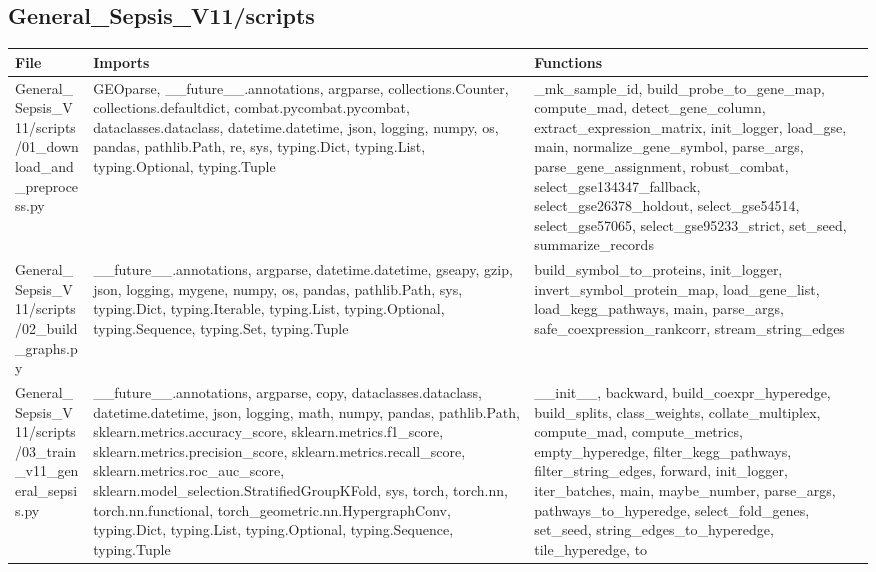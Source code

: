 \documentclass[11pt]{article}
\begin{document}
\subsection{General\_Sepsis\_V11/scripts}
\begin{longtable}{p{}p{}p{}}
\textbf{File} & \textbf{Imports} & \textbf{Functions} \\ \hline
General\_Sepsis\_V11/scripts/01\_download\_and\_preprocess.py & GEOparse, \_\_future\_\_.annotations, argparse, collections.Counter, collections.defaultdict, combat.pycombat.pycombat, dataclasses.dataclass, datetime.datetime, json, logging, numpy, os, pandas, pathlib.Path, re, sys, typing.Dict, typing.List, typing.Optional, typing.Tuple & \_mk\_sample\_id, build\_probe\_to\_gene\_map, compute\_mad, detect\_gene\_column, extract\_expression\_matrix, init\_logger, load\_gse, main, normalize\_gene\_symbol, parse\_args, parse\_gene\_assignment, robust\_combat, select\_gse134347\_fallback, select\_gse26378\_holdout, select\_gse54514, select\_gse57065, select\_gse95233\_strict, set\_seed, summarize\_records \\
General\_Sepsis\_V11/scripts/02\_build\_graphs.py & \_\_future\_\_.annotations, argparse, datetime.datetime, gseapy, gzip, json, logging, mygene, numpy, os, pandas, pathlib.Path, sys, typing.Dict, typing.Iterable, typing.List, typing.Optional, typing.Sequence, typing.Set, typing.Tuple & build\_symbol\_to\_proteins, init\_logger, invert\_symbol\_protein\_map, load\_gene\_list, load\_kegg\_pathways, main, parse\_args, safe\_coexpression\_rankcorr, stream\_string\_edges \\
General\_Sepsis\_V11/scripts/03\_train\_v11\_general\_sepsis.py & \_\_future\_\_.annotations, argparse, copy, dataclasses.dataclass, datetime.datetime, json, logging, math, numpy, pandas, pathlib.Path, sklearn.metrics.accuracy\_score, sklearn.metrics.f1\_score, sklearn.metrics.precision\_score, sklearn.metrics.recall\_score, sklearn.metrics.roc\_auc\_score, sklearn.model\_selection.StratifiedGroupKFold, sys, torch, torch.nn, torch.nn.functional, torch\_geometric.nn.HypergraphConv, typing.Dict, typing.List, typing.Optional, typing.Sequence, typing.Tuple & \_\_init\_\_, backward, build\_coexpr\_hyperedge, build\_splits, class\_weights, collate\_multiplex, compute\_mad, compute\_metrics, empty\_hyperedge, filter\_kegg\_pathways, filter\_string\_edges, forward, init\_logger, iter\_batches, main, maybe\_number, parse\_args, pathways\_to\_hyperedge, select\_fold\_genes, set\_seed, string\_edges\_to\_hyperedge, tile\_hyperedge, to \\

\end{longtable}
\end{document}
